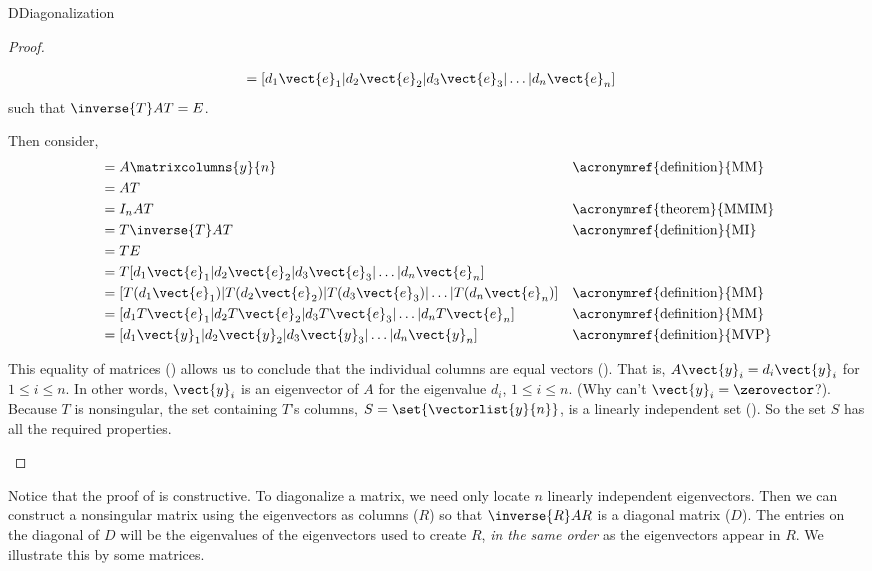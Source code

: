 \begin{subsect}{D}{Diagonalization}
\begin{proof}
\begin{para}
\begin{align*}
=[d_1\vect{e}_1|d_2\vect{e}_2|d_3\vect{e}_3|\ldots|d_n\vect{e}_n]&&\text{}
\end{align*}
%
such that $\inverse{T}AT=E$.\end{para}
%
\begin{para}Then consider,
%
\begin{align*}
[A\vect{y}_1|A\vect{y}_2|A\vect{y}_3|\ldots|A\vect{y}_n]&=A\matrixcolumns{y}{n}
&&\text{\acronymref{definition}{MM}}\\
%
&=AT\\
%
&=I_nAT
&&\text{\acronymref{theorem}{MMIM}}\\
%
&=T\inverse{T}AT
&&\text{\acronymref{definition}{MI}}\\
%
&=TE\\
%
&=T[d_1\vect{e}_1|d_2\vect{e}_2|d_3\vect{e}_3|\ldots|d_n\vect{e}_n]\\
%
&=[T(d_1\vect{e}_1)|T(d_2\vect{e}_2)|T(d_3\vect{e}_3)|\ldots|T(d_n\vect{e}_n)]
&&\text{\acronymref{definition}{MM}}\\
%
&=[d_1T\vect{e}_1|d_2T\vect{e}_2|d_3T\vect{e}_3|\ldots|d_nT\vect{e}_n]
&&\text{\acronymref{definition}{MM}}\\
%
&=[d_1\vect{y}_1|d_2\vect{y}_2|d_3\vect{y}_3|\ldots|d_n\vect{y}_n]
&&\text{\acronymref{definition}{MVP}}
%
\end{align*}
\end{para}
%
\begin{para}This equality of matrices () allows us to conclude that the individual columns are equal vectors ().  That is, $A\vect{y}_i=d_i\vect{y}_i$ for $1\leq i\leq n$.  In other words, $\vect{y}_i$ is an eigenvector of $A$ for the eigenvalue $d_i$, $1\leq i\leq n$.  (Why can't $\vect{y}_i=\zerovector$?).  Because $T$ is nonsingular, the set containing $T$'s columns, $S=\set{\vectorlist{y}{n}}$, is a linearly independent set ().  So the set $S$ has all the required properties.\end{para}
\end{proof}
%
\begin{para}Notice that the proof of  is constructive.  To diagonalize a matrix, we need only locate $n$ linearly independent eigenvectors.  Then we can construct a nonsingular matrix using the eigenvectors as columns ($R$) so that $\inverse{R}AR$ is a diagonal matrix ($D$).  The entries on the diagonal of $D$ will be the eigenvalues of the eigenvectors used to create $R$, {\em in the same order} as the eigenvectors appear in $R$.  We illustrate this by  some matrices.\end{para}

\end{subsect}
